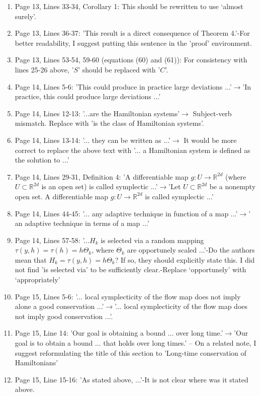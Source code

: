 \documentclass{article}
\begin{document}
\begin{enumerate}[label=(\arabic*)]
		\item Page 13, Lines 33-34, Corollary 1: This should be rewritten to use `almost surely'.
		\item Page 13, Lines 36-37: 'This result is a direct consequence of Theorem 4.'-For better readability, I suggest putting this sentence in the 'proof' environment.
		\item Page 13, Lines 53-54, 59-60 (equations (60) and (61)): For consistency with lines 25-26 above, '$S$' should be replaced with '$C$'.
		\item Page 14, Lines 5-6: 'This could produce in practice large deviations ...'$\to$'In practice, this could produce large deviations ...'
		\item Page 14, Lines 12-13: '...are the Hamiltonian systems'$\to$ Subject-verb mismatch. Replace with 'is the class of Hamiltonian systems'.
		\item Page 14, Lines 13-14: '... they can be written as ...'$\to$ It would be more correct to replace the above text with '... a Hamiltonian system is defined as the solution to ...'
		\item Page 14, Lines 29-31, Definition 4: 'A differentiable map $g:U\to\mathbb{R}^{2d}$ (where $U\subset \mathbb{R}^{2d}$ is an open set) is called symplectic ...'$\to$'Let $U\subset\mathbb{R}^{2d}$ be a nonempty open set. A differentiable map $g:U\to\mathbb{R}^{2d}$ is called symplectic ...'
		\item Page 14, Lines 44-45: '... any adaptive technique in function of a map ...'$\to$' an adaptive technique in terms of a map ...'
		\item Page 14, Lines 57-58: '...$H_k$ is selected via a random mapping $\tau(y,h)=\tau(h)=h\Theta_k$, where $\Theta_k$ are opportunely scaled ...'-Do the authors mean that $H_k=\tau(y,h)=h\Theta_k$? If so, they should explicitly state this. I did not find 'is selected via' to be sufficiently clear.-Replace `opportunely' with `appropriately'
		\item Page 15, Lines 5-6: '... local symplecticity of the flow map does not imply alone a good conservation ...'$\to$'... local symplecticity of the flow map does not imply good conservation ...'.
		\item Page 15, Line 14: 'Our goal is obtaining a bound ... over long time.'$\to$'Our goal is to obtain a bound ... that holds over long times.' -- On a related note, I suggest reformulating the title of this section to 'Long-time conservation of Hamiltonians'
		\item Page 15, Line 15-16: 'As stated above, ...'-It is not clear where was it stated above.

\end{enumerate}
\end{document}
